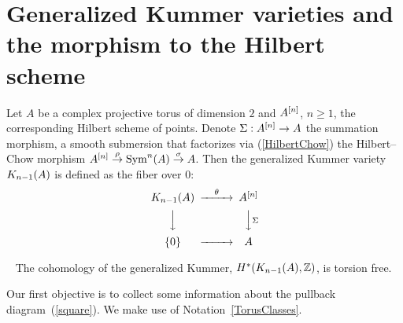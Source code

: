 \section[Generalized Kummer varieties and the morphism to the Hilbert scheme]{Generalized Kummer varieties and the morphism to the Hilbert scheme %
}
\label{Section_GeneralKummer}
\begin{definition}
Let $A$ be a complex projective torus of dimension $2$ and $A\hilb{n}$, $n\geq 1$, the corresponding Hilbert scheme of points. Denote $\Sigma : A\hilb{n} \rightarrow A$ the summation morphism, a smooth submersion that factorizes via (\ref{HilbertChow}) the Hilbert--Chow morphism $A\hilb{n}\stackrel{\rho}{\rightarrow}\Sym^n(A)\stackrel{\sigma}{\rightarrow} A$. Then the generalized Kummer variety $\kum{A}{n-1}$ is defined as the fiber over $0$:
\begin{equation}\label{square}
\begin{CD}
\kum{A}{n-1} @>\theta >> A\hilb{n}\\
@VVV @VV\Sigma V\\
\{0\} @> >> A
\end{CD}
\end{equation}
\end{definition}
\begin{theorem}~\cite[Theorem 2]{Spanier}\label{torsion}
The cohomology of the generalized Kummer, $H^*(\kum{A}{n-1},\Z)$, is torsion free. 
\end{theorem}
Our first objective is to collect some information about the pullback diagram~(\ref{square}). 
We make use of Notation~\ref{TorusClasses}.

